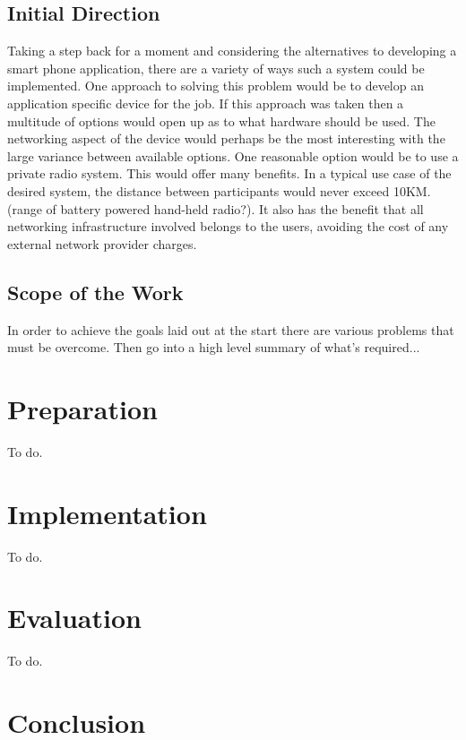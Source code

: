 \section{Initial Direction}

Taking a step back for a moment and considering the alternatives to developing a smart phone application, there are a variety of ways such a system could be implemented. One approach to solving this problem would be to develop an application specific device for the job. If this approach was taken then a multitude of options would open up as to what hardware should be used.
The networking aspect of the device would perhaps be the most interesting with the large variance between available options.
One reasonable option would be to use a private radio system. This would offer many benefits. In a typical use case of the desired system, the distance between participants would never exceed 10KM. (range of battery powered hand-held radio?). It also has the benefit that all networking infrastructure involved belongs to the users, avoiding the cost of any external network provider charges.

\section{Scope of the Work}

In order to achieve the goals laid out at the start there are various problems that must be overcome. Then go into a high level summary of what's required...

\cleardoublepage



\chapter{Preparation}

To do.


\cleardoublepage
\chapter{Implementation}

To do.

\cleardoublepage
\chapter{Evaluation}

To do.

\cleardoublepage
\chapter{Conclusion}

